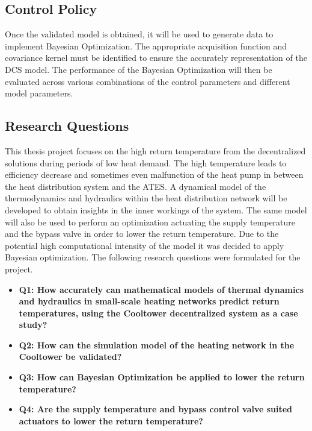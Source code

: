\subsection{Control Policy}
Once the validated model is obtained, it will be used to generate data to implement Bayesian Optimization. The appropriate acquisition function and covariance kernel must be identified to ensure the accurately representation of the DCS model. The performance of the Bayesian Optimization will then be evaluated across various combinations of the control parameters and different model parameters. 

\subsection{Research Questions}
This thesis project focuses on the high return temperature from the decentralized solutions during periods of low heat demand. The high temperature leads to efficiency decrease and sometimes even malfunction of the heat pump in between the heat distribution system and the ATES. A dynamical model of the thermodynamics and hydraulics within the heat distribution network will be developed to obtain insights in the inner workings of the system. The same model will also be used to perform an optimization actuating the supply temperature and the bypass valve in order to lower the return temperature. Due to the potential high computational intensity of the model it was decided to apply Bayesian optimization. The following research questions were formulated for the project.  

\begin{itemize}
  \renewcommand\labelitemi{} %
    \item \textbf{Q1: How accurately can mathematical models of thermal dynamics and hydraulics in small-scale heating networks predict return temperatures, using the Cooltower decentralized system as a case study?}
    \item \textbf{Q2: How can the simulation model of the heating network in the Cooltower be validated?}
    \item \textbf{Q3: How can Bayesian Optimization be applied to lower the return temperature?}
    \item \textbf{Q4: Are the supply temperature and bypass control valve suited actuators to lower the return temperature?}  
    
\end{itemize}

\newpage


